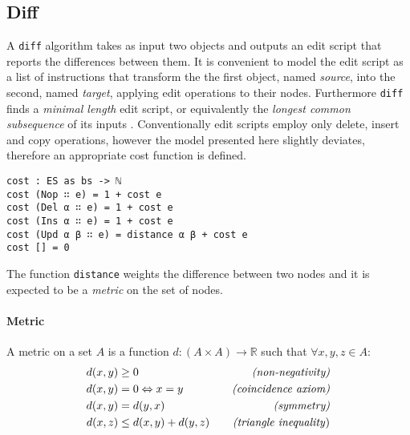 \documentclass[../Thesis.tex]{subfiles}
\begin{document}
	\subsection{Diff}
	\label{subsec:AlgoDiff}
	A \texttt{diff} algorithm takes as input two objects 
	and outputs an edit script that reports the differences between them.
	It is convenient to model the edit script as a list of instructions that
	transform the the first object, named \emph{source}, into the second,
	named \emph{target}, applying edit operations to their nodes.
	Furthermore \texttt{diff} finds a \emph{minimal length} edit script, or
	equivalently the \emph{longest common subsequence} of its inputs
	\cite{Berg00, PierceDiff3}.
	Conventionally edit scripts employ only delete, insert and copy operations,
	however the model presented here slightly deviates, therefore an 
	appropriate cost function is defined.

\begin{verbatim}
cost : ES as bs -> ℕ
cost (Nop ∷ e) = 1 + cost e
cost (Del α ∷ e) = 1 + cost e
cost (Ins α ∷ e) = 1 + cost e
cost (Upd α β ∷ e) = distance α β + cost e 
cost [] = 0
\end{verbatim}

	The function \texttt{distance} weights the difference between two nodes 
	and it is expected to be a \emph{metric} on the set of nodes.

	\paragraph{Metric}
	\label{par:Metric}
	A metric on a set $A$ is a function $d	 : (A \times A) \rightarrow \mathbb{R}$
	such that $\forall x, y, z \in A$:
	\begin{align*}
		d(x, y) &\geq 0 \quad &\mbox{\emph{{(non-negativity)}}}\\ 
		d(x, y) &= 0 \Leftrightarrow x = y \quad &\mbox{\emph{(coincidence axiom)}} \\		
		d(x, y) &= d(y, x) \quad &\mbox{\emph{(symmetry)}}\\
		d(x, z) &\leq d(x, y) + d(y, z) \quad &\mbox{\emph{(triangle inequality})}
	\end{align*}
	
\end{document}
